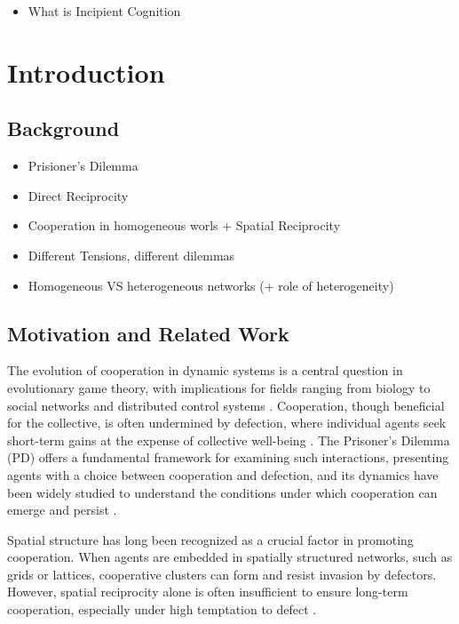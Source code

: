 \documentclass[runningheads]{llncs}
\begin{document}
\begin{itemize}
    \item What is Incipient Cognition
\end{itemize}


\section{Introduction}

\subsection{Background}

\begin{itemize}
    \item Prisioner's Dilemma
    \item Direct Reciprocity
    \item Cooperation in homogeneous worls + Spatial Reciprocity
    \item Different Tensions, different dilemmas
    \item Homogeneous VS heterogeneous networks (+ role of heterogeneity)
\end{itemize}

\subsection{Motivation and Related Work}
The evolution of cooperation in dynamic systems is a central question in evolutionary
game theory, with implications for fields ranging from biology to social networks
and distributed control systems \cite{nowak2006}. Cooperation, though beneficial for the collective,
is often undermined by defection, where individual agents seek short-term gains at
the expense of collective well-being \cite{axelrod1981}. The Prisoner’s Dilemma (PD) offers a
fundamental framework for examining such interactions, presenting agents with a
choice between cooperation and defection, and its dynamics have been widely studied
to understand the conditions under which cooperation can emerge and persist \cite{nowak1992}.

Spatial structure has long been recognized as a crucial factor in promoting cooperation.
When agents are embedded in spatially structured networks, such as grids or lattices,
cooperative clusters can form and resist invasion by defectors. However, spatial
reciprocity alone is often insufficient to ensure long-term cooperation, especially
under high temptation to defect \cite{nowak1992,szabo2007}.
\end{document}
